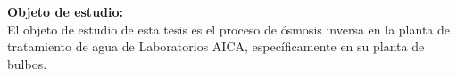 \textbf{Objeto de estudio:}\\
El objeto de estudio de esta tesis es el proceso de ósmosis inversa en la planta de tratamiento de agua de Laboratorios AICA, específicamente en su planta de bulbos.

